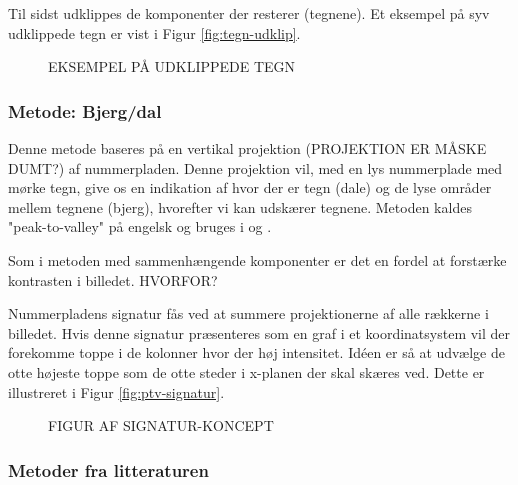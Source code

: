 Til sidst udklippes de komponenter der resterer (tegnene). Et eksempel på syv udklippede tegn er vist i Figur \vref{fig:tegn-udklip}.

\begin{figure}[htp]
  \centering
  \caption{EKSEMPEL PÅ UDKLIPPEDE TEGN}
  \label{fig:tegn-udklip}
\end{figure}

\subsubsection*{Metode: Bjerg/dal}
Denne metode baseres på en vertikal projektion (PROJEKTION ER MÅSKE DUMT?) af nummerpladen. Denne projektion vil, med en lys nummerplade med mørke tegn, give os en indikation af hvor der er tegn (dale) og de lyse områder mellem tegnene (bjerg), hvorefter vi kan udskærer tegnene. Metoden kaldes "peak-to-valley" på engelsk og bruges i \cite{ron} og \cite{kwas}.

Som i metoden med sammenhængende komponenter er det en fordel at forstærke kontrasten i billedet. HVORFOR?

Nummerpladens signatur fås ved at summere projektionerne af alle rækkerne i billedet. Hvis denne signatur præsenteres som en graf i et koordinatsystem vil der forekomme toppe i de kolonner hvor der høj intensitet. Idéen er så at udvælge de otte højeste toppe som de otte steder i x-planen der skal skæres ved. Dette er illustreret i Figur \vref{fig:ptv-signatur}.

\begin{figure}[htp]
  \centering
  \caption{FIGUR AF SIGNATUR-KONCEPT}
  \label{fig:ptv-signatur}
\end{figure}

\subsubsection{Metoder fra litteraturen}

